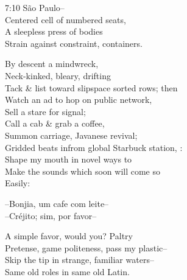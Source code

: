 

7:10 São Paulo-- \\
Centered cell of numbered seats, \\
A sleepless press of bodies \\
Strain against constraint, containers.

By descent a mindwreck, \\
Neck-kinked, bleary, drifting \\
Tack \& list toward slipspace sorted rows; then \\
Watch an ad to hop on public network, \\
Sell a stare for signal; \\
Call a cab \& grab a coffee, \\
Summon carriage, Javanese revival; \\
Gridded beats infrom global Starbuck station, : \\
Shape my mouth in novel ways to \\
Make the sounds which soon will come so \\
Easily:

--Bonjia, um cafe com leite-- \\
--Créjito; sim, por favor--

A simple favor, would you? Paltry \\
Pretense, game politeness, pass my plastic-- \\
Skip the tip in strange, familiar waters-- \\
Same old roles in same old Latin.
